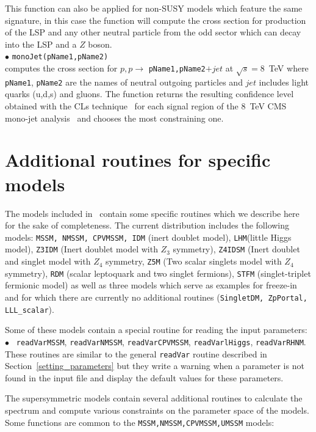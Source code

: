 \documentclass[12pt,a4paper]{article}
\begin{document}
This function can also be applied for non-SUSY models which feature the same signature, in this case the function will compute the cross section for production of the LSP and any other neutral particle from the odd sector which can decay into the LSP and a $Z$ boson.\\[2mm]
%
\noi$\bullet$   \verb|monoJet(pName1,pName2)|\\
computes the cross section for $p,p\rightarrow$ \verb|pName1,pName2|$ +jet$ at $\sqrt{s}=8$~TeV 
where \verb|pName1|, \verb|pName2| are the names of neutral outgoing particles and $jet$ includes light quarks (u,d,s)  and gluons.
The function returns  the resulting  confidence level  obtained with the CLs technique~\cite{Read:2002hq,Read:2000ru} for each  signal region of the 8~TeV CMS mono-jet analysis~\cite{Khachatryan:2014rra} and chooses the most constraining one.



\section{Additional routines for specific models}
The models included in \micro\ contain some specific routines
which we describe here for the sake of completeness. The current 
distribution includes the following models: {\tt MSSM, NMSSM, CPVMSSM, IDM}  (inert doublet model), {\tt LHM}(little Higgs model),
  {\tt Z3IDM} (Inert doublet model with $Z_3$ symmetry), {\tt Z4IDSM} (Inert doublet and singlet model with $Z_4$ symmetry,  {\tt Z5M} (Two scalar  singlets model with $Z_4$ symmetry), {\tt RDM} (scalar leptoquark and two singlet fermions), {\tt STFM} (singlet-triplet fermionic model)  as well as three models which serve as examples for freeze-in and for which there are currently no additional routines (\verb|SingletDM, ZpPortal, LLL_scalar|).

Some of these models contain a special routine for reading the input parameters:\\
$\bullet$ \verb| readVarMSSM|, \verb|readVarNMSSM|,  \verb|readVarCPVMSSM|,
\verb|readVarlHiggs|, \verb|readVarRHNM|.\\
 These routines  are similar to the general 
\verb|readVar| routine described  in Section~\ref{setting_parameters}
but  they write a warning when a parameter is not found in the 
input file and display the default values for these parameters.

The supersymmetric models contain several additional routines to calculate the spectrum
and compute various constraints on the parameter space of the models. Some functions are
common to the \verb|MSSM,NMSSM,CPVMSSM,UMSSM| models: 
\end{document}
